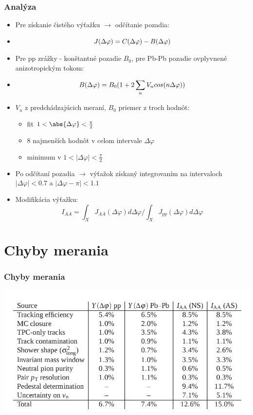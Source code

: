 \documentclass{beamer}
\begin{document}
	\begin{frame}
		\frametitle{Analýza}
		\begin{itemize}
			\item \footnotesize {Pre získanie čistého výťažku $\rightarrow$ odčítanie pozadia:}
			\item[]\footnotesize  {\begin{equation} \centering
			         J(\Delta\varphi)=C(\Delta\varphi) - B(\Delta\varphi)
			         \end{equation}}
			\item \footnotesize {Pre pp zrážky - konštantné pozadie $B_0$, pre Pb-Pb pozadie ovplyvnené anizotropickým tokom:}
			\item[]  \footnotesize {\begin{equation}\centering
			         B(\Delta\varphi)=B_0 (1+2\displaystyle\sum_{n}V_n cos(n\Delta\varphi))
			         \end{equation}}
			\item \footnotesize {$V_n$ z predchádzajúcich meraní, $B_0$ priemer z troch hodnôt:}
			\begin{itemize}	
				\item \scriptsize {fit $1<\abs{\Delta\varphi}<\frac{\pi}{2}$}
				\item \scriptsize {8 najmenších hodnôt v celom intervale $\Delta\varphi$}
				\item \scriptsize {minimum v $1<\lvert\Delta\varphi\rvert<\frac{\pi}{2}$}
			\end{itemize}	
			\item \footnotesize {Po odčítaní pozadia $\rightarrow$ výťažok získaný integrovaním na intervaloch $\lvert\Delta \varphi\rvert < 0.7$ a $\lvert\Delta \varphi - \pi\rvert < 1.1$}
			\item \footnotesize {Modifikácia výťažku: \begin{equation}
						   I_{AA}=\int_X J_{AA} (\Delta\varphi) d\Delta\varphi / \int_X J_{pp} (\Delta\varphi) d\Delta\varphi
						   \end{equation}}
			
		\end{itemize}
	\end{frame}
	
	\section{Chyby merania}
	\begin{frame}
		\frametitle{Chyby merania}
		\centering \includegraphics[scale=0.35]{./Obrazky/nepresnosti.png}
	\end{frame}
	
\end{document}
